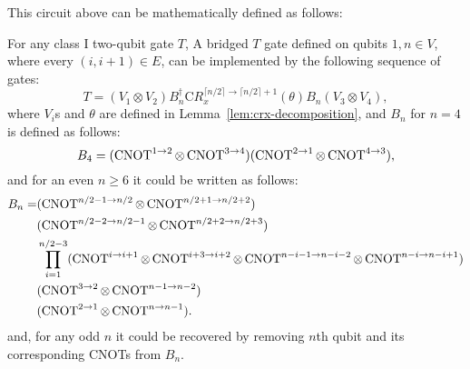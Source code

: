 This circuit above can be mathematically defined as follows:

\begin{theorem}
  For any class I two-qubit gate $T$, A bridged $T$ gate defined on qubits $1, n \in V$, where every $(i, i + 1) \in E$, can be implemented by the following sequence of gates:
  \begin{equation}
    T = (V_1 \otimes V_2) B^\dagger_n \mathrm{C}R_x^{\lceil n/2 \rceil \to \lceil n/2\rceil+1}(\theta) B_n (V_3 \otimes V_4),
  \end{equation}
  where $V_i$s and $\theta$ are defined in Lemma~\ref{lem:crx-decomposition}, and $B_n$ for $n = 4$ is defined as follows:
  \begin{equation}
    B_4 = (\operatorname{CNOT}^{1 \to 2} \otimes \operatorname{CNOT}^{3 \to 4}) (\operatorname{CNOT}^{2 \to 1} \otimes \operatorname{CNOT}^{4 \to 3}),
  \end{equation}
  and for an even $n \ge 6$ it could be written as follows:
  \begin{equation}
    \begin{aligned}
    B_{n} = &(\operatorname{CNOT}^{n/2 - 1 \to n/2} \otimes \operatorname{CNOT}^{n/2 + 1 \to n/2 + 2}) \\
    &(\operatorname{CNOT}^{n/2 - 2 \to n/2 - 1} \otimes \operatorname{CNOT}^{n/2 + 2 \to n/2 + 3}) \\
    &\prod_{i=1}^{n/2 - 3} (\operatorname{CNOT}^{i \to i+1} \otimes \operatorname{CNOT}^{i+3 \to i+2} \otimes \operatorname{CNOT}^{n-i-1 \to n-i-2} \otimes \operatorname{CNOT}^{n-i \to n-i+1}) \\
    &(\operatorname{CNOT}^{3 \to 2} \otimes \operatorname{CNOT}^{n-1 \to n-2}) \\
    &(\operatorname{CNOT}^{2 \to 1} \otimes \operatorname{CNOT}^{n \to n-1}).
    \end{aligned}
  \end{equation}
  and, for any odd $n$ it could be recovered by removing $n$th qubit and its corresponding CNOTs from $B_n$.
\end{theorem}

